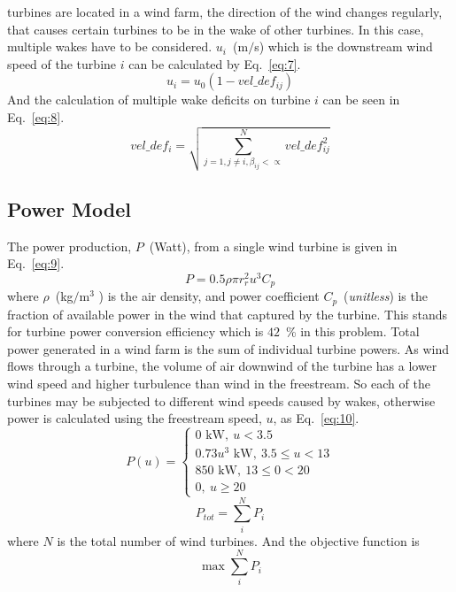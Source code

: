 \documentclass[]{iptconf}
\begin{document}
turbines are located in a wind farm, the direction of the wind changes regularly, that
causes certain turbines to be in the wake of other turbines. In this case, multiple
wakes have to be considered. $u_i$~(m$/$s) which is the downstream wind speed of the
turbine $i$ can be calculated by Eq.~\eqref{eq:7}.
\begin{equation}
	\label{eq:7}
	u_i=u_0(1-vel\_def_{ij})
\end{equation}
And the calculation of multiple wake deficits on turbine $i$ can be seen in Eq.~\eqref{eq:8}.
\begin{equation}
	\label{eq:8}
	vel\_def_{i}=\sqrt{\sum\limits^{N}_{j=1,j\neq i,\beta_{ij}<\propto}vel\_def_{ij}^2}
\end{equation}





\subsection{Power Model} \label{subsec:powermodel}
The power production, $P$~(Watt), from a single wind turbine is given in Eq.~\eqref{eq:9}.
\begin{equation}
	\label{eq:9}
	P=0.5\rho\pi r_r^2u^3C_p
\end{equation}
where $\rho$~(kg$/\text{m}^3$ ) is the air density, and power coefficient $C_p$~(\textit{unitless}) is the fraction
of available power in the wind that captured by the turbine. This stands for turbine
power conversion efficiency which is $42$~\% in this problem.
Total power generated in a wind farm is the sum of individual turbine powers.
As wind flows through a turbine, the volume of air downwind of the turbine has
a lower wind speed and higher turbulence than wind in the freestream. So each of
the turbines may be subjected to different wind speeds caused by wakes, otherwise
power is calculated using the freestream speed, $u$, as Eq.~\eqref{eq:10}.
\begin{equation}
	\label{eq:10}
	P(u)=
	\begin{cases} 
	0\text{~kW},\: u<3.5\\
	0.73u^3\text{~kW},\: 3.5\leqslant u<13 \\
	850\text{~kW},\: 13\leqslant 0<20 \\
	0,\: u\geqslant 20
	\end{cases}
\end{equation}
\begin{equation}
	\label{eq:11}
	P_{tot}=\sum\limits^{N}_{i}P_i
\end{equation}
where $N$ is the total number of wind turbines. And the objective function is
$$\max\sum\limits^{N}_{i}P_i$$
\end{document}
